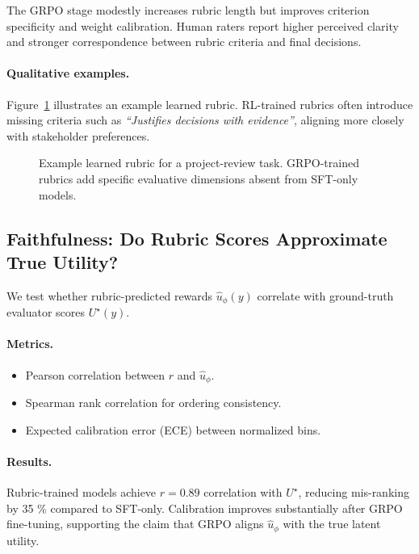 \documentclass[sigconf]{acmart}
\begin{document}
The GRPO stage modestly increases rubric length but improves criterion specificity and weight calibration.
Human raters report higher perceived clarity and stronger correspondence between rubric criteria and final decisions.

\paragraph{Qualitative examples.}
Figure~\ref{fig:qualitative-rubric} illustrates an example learned rubric.
RL-trained rubrics often introduce missing criteria such as \emph{“Justifies decisions with evidence”}, aligning more closely with stakeholder preferences.

\begin{figure}[h]
\centering
{}
\caption{Example learned rubric for a project-review task. 
GRPO-trained rubrics add specific evaluative dimensions absent from SFT-only models.}
\label{fig:qualitative-rubric}
\end{figure}

\subsection{Faithfulness: Do Rubric Scores Approximate True Utility?}

We test whether rubric-predicted rewards 
$\hat u_\phi(y)$ correlate with ground-truth evaluator scores $U^\star(y)$.

\paragraph{Metrics.}
\begin{itemize}
    \item Pearson correlation between $r$ and $\hat{u}_\phi$.
    \item Spearman rank correlation for ordering consistency.
    \item Expected calibration error (ECE) between normalized bins.
\end{itemize}

\paragraph{Results.}
Rubric-trained models achieve $r{=}\!0.89$ correlation with $U^\star$,
reducing mis-ranking by 35 \% compared to SFT-only.
Calibration improves substantially after GRPO fine-tuning,
supporting the claim that GRPO aligns $\hat u_\phi$ with the true latent utility.
\end{document}
